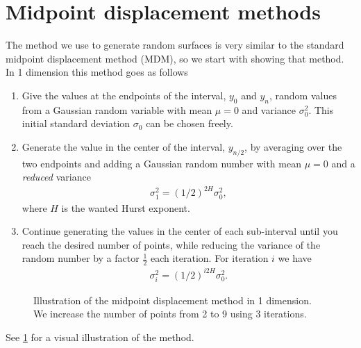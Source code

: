 \section{Midpoint displacement methods}
%
The method we use to generate random surfaces is very similar to the standard midpoint displacement method (MDM), so we start with showing that method. In 1 dimension this method goes as follows
%
\begin{enumerate}
    \item Give the values at the endpoints of the interval, $y_0$ and $y_n$, random values from a Gaussian random variable with mean $\mu = 0$ and variance $\sigma_0^2$. This initial standard deviation $\sigma_0$ can be chosen freely.
    \item Generate the value in the center of the interval, $y_{n/2}$, by averaging over the two endpoints and adding a Gaussian random number with mean $\mu = 0$ and a \emph{reduced} variance
    \begin{align}
         \sigma_1^2 = \left(1/2\right)^{2H}\sigma_0^2, \label{eq:midpoint_sigma_first}
    \end{align}
    where $H$ is the wanted Hurst exponent.
    \item Continue generating the values in the center of each sub-interval until you reach the desired number of points, while reducing the variance of the random number by a factor $\frac{1}{2}$ each iteration. %
    For iteration $i$ we have
    \begin{align}
        \sigma_i^2 = \left(1/2\right)^{i2H}\sigma_0^2. \label{eq:midpoint_sigma_general}
    \end{align}
\end{enumerate}
%
\begin{figure}[htpb]%
    \centering%
    \caption{%
        Illustration of the midpoint displacement method in 1 dimension. We increase the number of points from 2 to 9 using 3 iterations.%
        \label{fig:midpoint01}%
    }%
\end{figure}%
See \cref{fig:midpoint01} for a visual illustration of the method.

